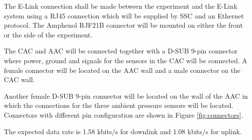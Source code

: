 \documentclass[a4paper,12pt,twoside]{article}
\begin{document}
The E-Link connection shall be made between the experiment and the E-Link system using a RJ45 connection which will be supplied by SSC and an Ethernet protocol. The Amphenol RJF21B connector will be mounted on either the front or the side of the experiment\cite{BexusManual}.  

The CAC and AAC will be connected together with a D-SUB 9-pin connector where power, ground and signals for the sensors in the CAC will be connected. A female connector will be located on the AAC wall and a male connector on the CAC wall.

Another female D-SUB 9-pin connector will be located on the wall of the AAC in which the connections for the three ambient pressure sensors will be located. Connectors with different pin configuration are shown in Figure \ref{fig:connectors}.

The expected data rate is 1.58 kbits/s for downlink and 1.08 kbits/s for uplink.

\end{document}
